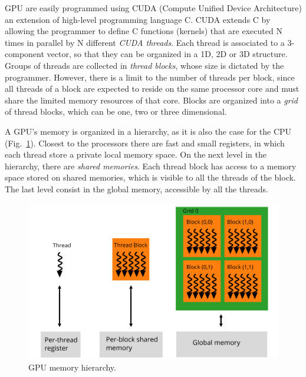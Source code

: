 GPU are easily programmed using CUDA (Compute Unified Device Architecture) an extension of high-level programming language C. CUDA extends C by allowing the programmer to define C functions (kernels) that are executed N times in parallel by N different \textit{CUDA threads}. Each thread is associated to a 3-component vector, so that they can be organized in a 1D, 2D or 3D structure. Groups of threads are collected in \textit{thread blocks}, whose size is dictated by the programmer. However, there is a limit to the number of threads per block, since all threads of a block are expected to reside on the same processor core and must share the limited memory resources of that core. Blocks are organized into a \textit{grid} of thread blocks, which can be one, two or three dimensional.

A GPU's memory is organized in a hierarchy, as it is also the case for the CPU (Fig.~\ref{fig:GPU-memory-hierarchy}). Closest to the processors there are fast and small registers, in which each thread store a private local memory space. On the next level in the hierarchy, there are \textit{shared memories}. Each thread block has access to a memory space stored on shared memories, which is visible to all the threads of the block. The last level consist in the global memory, accessible by all the threads.
\begin{figure}
   \centering
   \includegraphics[width=12cm]{Figs/GPU-memory-hierarchy.pdf}
   \caption{GPU memory hierarchy.} \label{fig:GPU-memory-hierarchy}
\end{figure}


